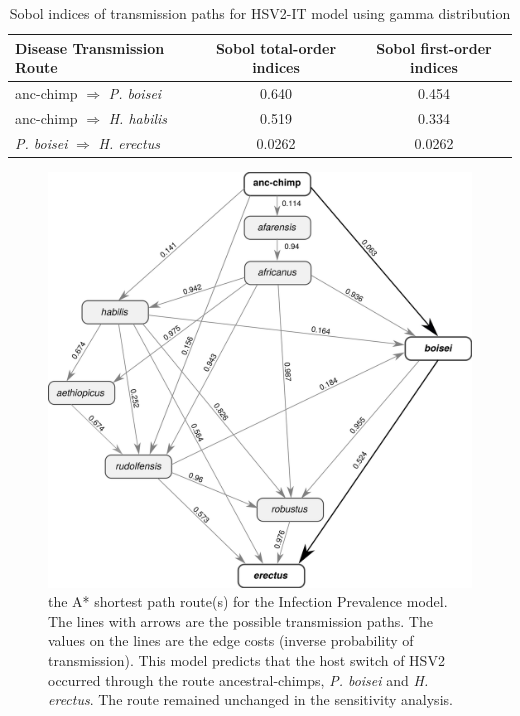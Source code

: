 \documentclass[fleqn,10pt]{wlscirep}
\begin{document}
\begin{table}[!tbhp]
\caption{Sobol indices of transmission paths for HSV2-IT model using gamma distribution}
\centering
\renewcommand{\arraystretch}{1.5}
\label{table:sobol}
\begin{tabulary}{\linewidth}{LCC}
\toprule
Disease Transmission Route & 
Sobol total-order indices & 
Sobol first-order indices \\ 
\midrule
anc-chimp $\Rightarrow$ \textit{P. boisei} & 0.640 & 0.454\\


anc-chimp $\Rightarrow$ \textit{H. habilis} & 0.519 & 0.334 \\

\textit{P. boisei} $\Rightarrow$ \textit{H. erectus} & 0.0262 & 0.0262 \\
\bottomrule
\end{tabulary}
\end{table}

\begin{figure}[!tbhp]
  \centering
  \includegraphics[width=\textwidth]{figs/dag-ip}
  \caption{the A* shortest path route(s) for the Infection Prevalence model. The lines with arrows are the possible transmission paths. The values on the lines are the edge costs (inverse probability of transmission). This model predicts that the host switch of HSV2 occurred through the route ancestral-chimps, \textit{P. boisei} and \textit{H. erectus}. The route remained unchanged in the sensitivity analysis.}
  \label{fig:dag-ip}   
\end{figure}  
\end{document}
